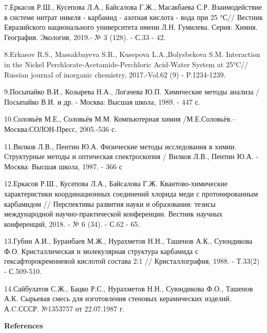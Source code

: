\begin{noparindent}
7.Еркасов Р.Ш., Кусепова Л.А., Байсалова Г.Ж., Масакбаева С.Р.
Взаимодействие в системе нитрат никеля - карбамид - азотная кислота -
вода при 25 °С// Вестник Евразийского национального университета имени
Л.Н. Гумилева. Серия: Химия. География. Экология, 2019.- № 3 (128). -
С.33 - 42.

8.Erkasov R.S., Massakbayeva S.R., Kusepova L.A.,Bolysbekova S.M.
Interaction in the Nickel Perchlorate-Acetamide-Perchloric Acid-Water
System at 25°C// Russian journal of inorganic chemistry, 2017.-Vol.62
(9) - P.1234-1239.

9.Посыпайко В.И., Козырева Н.А., Логачева Ю.П. Химические методы анализа
/ Посыпайко В.И. и др. - Москва: Высшая школа, 1989. - 447 с.

10.Соловьёв М.Е., Соловьёв М.М. Компьютерная химия
/М.Е.Соловьёв.--Москва:СОЛОН-Пресс, 2005.-536 с.

11.Вилков Л.В., Пентин Ю.А. Физические методы исследования в химии.
Структурные методы и оптическая спектроскопия / Вилков Л.В., Пентин Ю.А.
- Москва: Высшая школа, 1987. - 366 с

12.Еркасов Р.Ш., Кусепова Л.А., Байсалова Г.Ж. Квантово-химические
характеристики координационных соединений хлорида меди с протонированным
карбамидом // Перспективы развития науки и образования: тезисы
международной научно-практической конференции. Вестник научных
конференций, 2018. - № 6 (34). - С.62 - 65.

13.Губин А.И., Буранбаев М.Ж., Нурахметов Н.Н., Ташенов А.К., Суюндикова
Ф.О. Кристаллическая и молекулярная структура карбамида с
гексафторокремниевой кислотой состава 2:1 // Кристаллография, 1988. -
Т.33(2) - С.509-510.

14.Сайбулатов С.Ж., Бацко Р.С., Нурахметов Н.Н., Суюндикова Ф.О.,
Ташенов А.К. Сырьевая смесь для изготовления стеновых керамических
изделий. А.C.СССР. №1353757 от 22.07.1987 г.
\end{noparindent}

\begin{center}
{\bfseries References}
\end{center}

